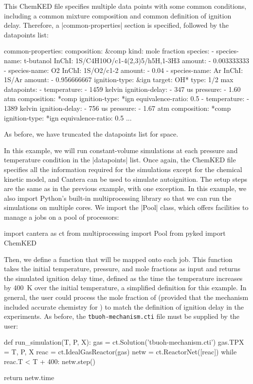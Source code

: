 \documentclass[12pt]{ijck}
\newcommand\ck{ChemKED}
\begin{document}
This \ck{} file specifies multiple data points with some common
conditions, including a common mixture composition and common definition of
ignition delay. Therefore, a \yabox|common-properties| section is specified, followed by the
datapoints list:
%
\begin{yamlbox}
common-properties:
  composition: &comp
    kind: mole fraction
    species:
      - species-name: t-butanol
        InChI: 1S/C4H10O/c1-4(2,3)5/h5H,1-3H3
        amount:
          - 0.003333333
      - species-name: O2
        InChI:  1S/O2/c1-2
        amount:
          - 0.04
      - species-name: Ar
        InChI:  1S/Ar
        amount:
          - 0.956666667
  ignition-type: &ign
    target: OH*
    type: 1/2 max
datapoints:
  - temperature:
      - 1459 kelvin
    ignition-delay:
      - 347 us
    pressure:
      - 1.60 atm
    composition: *comp
    ignition-type: *ign
    equivalence-ratio: 0.5
  - temperature:
      - 1389 kelvin
    ignition-delay:
      - 756 us
    pressure:
      - 1.67 atm
    composition: *comp
    ignition-type: *ign
    equivalence-ratio: 0.5
    ...
\end{yamlbox}
%
As before, we have truncated the datapoints list for space.

In this example, we will run constant-volume simulations at each
pressure and temperature condition in the \yabox|datapoints| list. Once again,
the \ck{} file specifies all the information required for the simulations except
for the chemical kinetic model, and Cantera can be used to simulate autoignition. The setup steps
are the same as in the previous example, with one exception. In this example, we also import
Python's built-in multiprocessing library so that we can run the simulations on multiple cores. We
import the \pybox|Pool| class, which offers facilities to manage a jobs on a pool of processors:
%
\begin{pythonbox}
import cantera as ct
from multiprocessing import Pool
from pyked import ChemKED
\end{pythonbox}

Then, we define a function that will be mapped onto each job. This function takes the initial
temperature, pressure, and mole fractions as input and returns the simulated ignition delay time,
defined as the time the temperature increases by \SI{400}{\K} over the initial temperature, a
simplified definition for this example. In general, the user could process the mole fraction of
 (provided that the mechanism included accurate chemistry for ) to match the
definition of ignition delay in the experiments. As before, the \verb|tbuoh-mechanism.cti| file must
be supplied by the user:
%
\begin{pythonbox}
def run_simulation(T, P, X):
    gas = ct.Solution('tbuoh-mechanism.cti')
    gas.TPX = T, P, X
    reac = ct.IdealGasReactor(gas)
    netw = ct.ReactorNet([reac])
    while reac.T < T + 400:
        netw.step()

    return netw.time
\end{pythonbox}
\end{document}
